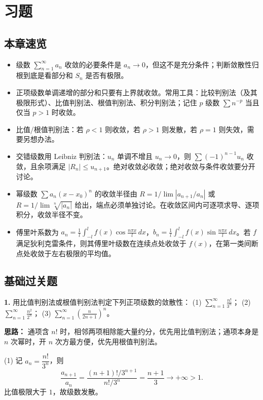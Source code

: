 \section{习题}

\subsection{本章速览}
\begin{itemize}
    \item 级数 $\sum_{n=1}^{\infty}a_n$ 收敛的必要条件是 $a_n\to0$，但这不是充分条件；判断敛散性归根到底是看部分和 $S_n$ 是否有极限。
    \item 正项级数单调递增的部分和只要有上界就收敛。常用工具：比较判别法（及其极限形式）、比值判别法、根值判别法、积分判别法；记住 $p$ 级数 $\sum n^{-p}$ 当且仅当 $p>1$ 时收敛。
    \item 比值/根值判别法：若 $\rho<1$ 则收敛，若 $\rho>1$ 则发散，若 $\rho=1$ 则失效，需要另想办法。
    \item 交错级数用 Leibniz 判别法：$u_n$ 单调不增且 $u_n\to0$，则 $\sum(-1)^{n-1}u_n$ 收敛，且余项满足 $|R_n|\le u_{n+1}$。绝对收敛必收敛；绝对收敛与条件收敛要分开讨论。
    \item 幂级数 $\sum a_n(x-x_0)^n$ 的收敛半径由 $R=1/\lim|a_{n+1}/a_n|$ 或 $R=1/\lim\sqrt[n]{|a_n|}$ 给出，端点必须单独讨论。在收敛区间内可逐项求导、逐项积分，收敛半径不变。
    \item 傅里叶系数为 $a_n=\frac1l\int_{-l}^{l}f(x)\cos\frac{n\pi x}{l}\,dx$，$b_n=\frac1l\int_{-l}^{l}f(x)\sin\frac{n\pi x}{l}\,dx$。若 $f$ 满足狄利克雷条件，则其傅里叶级数在连续点处收敛于 $f(x)$，在第一类间断点处收敛于左右极限的平均值。
\end{itemize}

\subsection{基础过关题}

\textbf{1.} 用比值判别法或根值判别法判定下列正项级数的敛散性：
(1) $\displaystyle\sum_{n=1}^{\infty}\frac{n!}{3^n}$；
(2) $\displaystyle\sum_{n=1}^{\infty}\frac{n^2}{2^n}$；
(3) $\displaystyle\sum_{n=1}^{\infty}\left(\frac{n}{2n+1}\right)^n$。

\ifshowsolutions%
\textbf{思路：} 通项含 $n!$ 时，相邻两项相除能大量约分，优先用比值判别法；通项本身是 $n$ 次幂时，开 $n$ 次方最方便，优先用根值判别法。

(1) 记 $a_n=\dfrac{n!}{3^n}$，则
\[
\frac{a_{n+1}}{a_n}
=\frac{(n+1)!/3^{n+1}}{n!/3^n}
=\frac{n+1}{3}\longrightarrow+\infty>1.
\]
比值极限大于 $1$，故级数发散。


